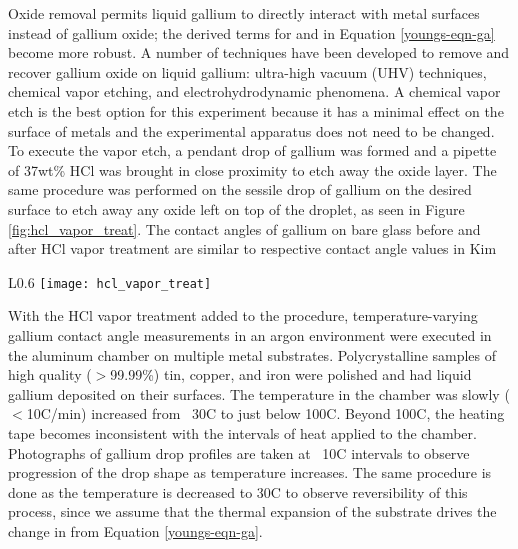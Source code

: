 Oxide removal permits liquid gallium to directly interact with metal surfaces instead of gallium oxide; the derived terms for \gamSL and \gamLV in Equation \ref{youngs-eqn-ga} become more robust. A number of techniques have been developed to remove and recover gallium oxide on liquid gallium: ultra-high vacuum (UHV) techniques,\cite{Regan1995,Regan1997} chemical vapor etching,\cite{Kim2013,Doudrick2014} and electrohydrodynamic phenomena.\cite{Khan2014} A chemical vapor etch is the best option for this experiment because it has a minimal effect on the surface of metals and the experimental apparatus does not need to be changed. To execute the vapor etch, a pendant drop of gallium was formed and a pipette of 37wt\% HCl was brought in close proximity to etch away the oxide layer. The same procedure was performed on the sessile drop of gallium on the desired surface to etch away any oxide left on top of the droplet, as seen in Figure \ref{fig:hcl_vapor_treat}. The contact angles of gallium on bare glass before and after HCl vapor treatment are similar to respective contact angle values in Kim \etal\cite{Kim2013}

\begin{wrapfigure}[8]{L}{0.6\linewidth}
	\centering
	\texttt{[image: hcl\_vapor\_treat]}
	\caption{This image shows the contact angle of gallium on a bare glass slide in an argon environment before and after HCl vapor treatment.}
	\label{fig:hcl_vapor_treat}
\end{wrapfigure}

With the HCl vapor treatment added to the procedure, temperature-varying gallium contact angle measurements in an argon environment were executed in the aluminum chamber on multiple metal substrates. Polycrystalline samples of high quality ($>$99.99\%) tin, copper, and iron were polished and had liquid gallium deposited on their surfaces. The temperature in the chamber was slowly ($<$10\degree C/min) increased from ~30\degree C to just below 100\degree C. Beyond 100\degree C, the heating tape becomes inconsistent with the intervals of heat applied to the chamber. Photographs of gallium drop profiles are taken at ~10\degree C intervals to observe progression of the drop shape as temperature increases. The same procedure is done as the temperature is decreased to 30\degree C to observe reversibility of this process, since we assume that the thermal expansion of the substrate drives the change in \gamSL from Equation \ref{youngs-eqn-ga}. 

